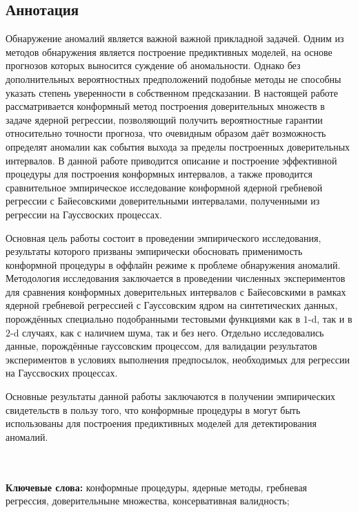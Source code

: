 \documentclass[a4paper,14pt]{extarticle}
\begin{document}
\clearpage
\begin{titlepage}
\thispagestyle{empty}
\section*{Аннотация}

Обнаружение аномалий является важной важной прикладной задачей. Одним из методов
обнаружения является построение предиктивных моделей, на основе прогнозов которых
выносится суждение об аномальности. Однако без дополнительных вероятностных предположений
подобные методы не способны указать степень уверенности в собственном предсказании.
В настоящей работе рассматривается конформный метод построения доверительных множеств
в задаче ядерной регрессии, позволяющий получить вероятностные гарантии относительно
точности прогноза, что очевидным образом даёт возможность определят аномалии как
события выхода за пределы построенных доверительных интервалов. В данной работе
приводится описание и построение эффективной процедуры для построения конформных
интервалов, а также проводится сравнительное эмпирическое исследование конформной
ядерной гребневой регрессии с Байесовскими доверительными интервалами, полученными
из регрессии на Гауссвоских процессах.

Основная цель работы состоит в проведении эмпирического исследования, результаты
которого призваны эмпирически обосновать применимость конформной процедуры в оффлайн
режиме к проблеме обнаружения аномалий. Методология исследования заключается в проведении
численных экспериментов для сравнения конформных доверительных интервалов с Байесовскими
в рамках ядерной гребневой регрессией с Гауссовским ядром на синтетических данных,
порождённых специально подобранными тестовыми функциями как в $1$-d, так и в $2$-d
случаях, как с наличием шума, так и без него. Отдельно исследовались данные, порождённые
гауссовским процессом, для валидации результатов экспериментов в условиях выполнения
предпосылок, необходимых для регрессии на Гауссвоских процессах.

Основные результаты данной работы заключаются в получении эмпирических свидетельств
в пользу того, что конформные процедуры в могут быть использованы для построения
предиктивных моделей для детектирования аномалий.

\hfill\\\hfill\\
\noindent\textbf{Ключевые слова:} конформные процедуры, ядерные методы, гребневая регрессия,
доверительныне множества, консервативная валидность;
\end{titlepage}
\end{document}
